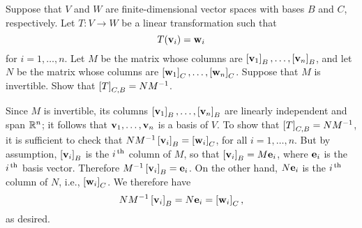 \begin{ex}
  Suppose that $V$ and $W$ are finite-dimensional vector spaces with
  bases $B$ and $C$, respectively. Let $T:V\to W$ be a linear
  transformation such that
  \begin{equation*}
    T(\vect{v}_i)=\vect{w}_i
  \end{equation*}
  for $i=1,\ldots,n$. Let $M$ be the matrix whose columns are
  $\coord{\vect{v}_1}_B,\ldots,\coord{\vect{v}_n}_B$, and let $N$ be
  the matrix whose columns are
  $\coord{\vect{w}_1}_C,\ldots,\coord{\vect{w}_n}_C$.  Suppose that
  $M$ is invertible. Show that $\left[T\right]_{C,B} = NM^{-1}$.
  \begin{sol}
    Since $M$ is invertible, its columns
    $\coord{\vect{v}_1}_B,\ldots,\coord{\vect{v}_n}_B$ are linearly
    independent and span $\mathbb{R}^n$; it follows that
    $\vect{v}_1,\ldots,\vect{v}_n$ is a basis of $V$. To show that
    $\left[T\right]_{C,B} = NM^{-1}$, it is sufficient to check that
    $NM^{-1}\coord{\vect{v}_i}_B = \coord{\vect{w}_i}_C$, for all
    $i=1,\ldots,n$. But by assumption, $\coord{\vect{v}_i}_B$ is the
    $i^{\,\rm th}$ column of $M$, so that $\coord{\vect{v}_i}_B =
    M\vect{e}_i$, where $\vect{e}_i$ is the $i^{\,\rm th}$ basis
    vector. Therefore $M^{-1}\coord{\vect{v}_i}_B  = \vect{e}_i$.
    On the other hand, $N\vect{e}_i$ is the $i^{\,\rm th}$ column of $N$,
    i.e., $\coord{\vect{w}_i}_C$. We therefore have
    \begin{equation*}
      NM^{-1}\coord{\vect{v}_i}_B = N\vect{e}_i = \coord{\vect{w}_i}_C,
    \end{equation*}
    as desired.
  \end{sol}
\end{ex}

